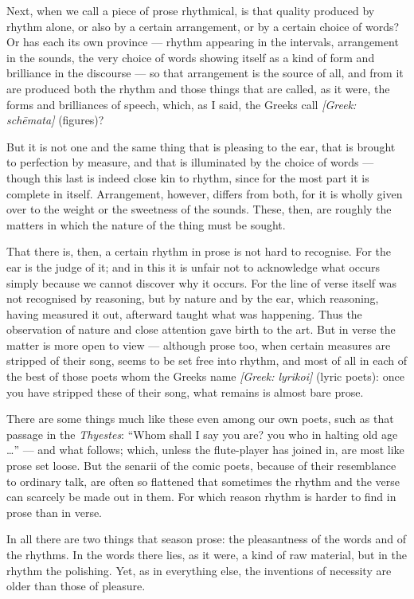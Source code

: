  Next, when we call a piece of prose rhythmical, is that quality produced by rhythm alone, or also by a certain arrangement, or by a certain choice of words? Or has each its own province — rhythm appearing in the intervals, arrangement in the sounds, the very choice of words showing itself as a kind of form and brilliance in the discourse — so that arrangement is the source of all, and from it are produced both the rhythm and those things that are called, as it were, the forms and brilliances of speech, which, as I said, the Greeks call \textit{[Greek: schēmata]} (figures)?

 But it is not one and the same thing that is pleasing to the ear, that is brought to perfection by measure, and that is illuminated by the choice of words — though this last is indeed close kin to rhythm, since for the most part it is complete in itself. Arrangement, however, differs from both, for it is wholly given over to the weight or the sweetness of the sounds. These, then, are roughly the matters in which the nature of the thing must be sought.

 That there is, then, a certain rhythm in prose is not hard to recognise. For the ear is the judge of it; and in this it is unfair not to acknowledge what occurs simply because we cannot discover why it occurs. For the line of verse itself was not recognised by reasoning, but by nature and by the ear, which reasoning, having measured it out, afterward taught what was happening. Thus the observation of nature and close attention gave birth to the art. But in verse the matter is more open to view — although prose too, when certain measures are stripped of their song, seems to be set free into rhythm, and most of all in each of the best of those poets whom the Greeks name \textit{[Greek: lyrikoi]} (lyric poets): once you have stripped these of their song, what remains is almost bare prose.

 There are some things much like these even among our own poets, such as that passage in the \textit{Thyestes}: ``Whom shall I say you are? you who in halting old age \dots'' — and what follows; which, unless the flute-player has joined in, are most like prose set loose. But the senarii of the comic poets, because of their resemblance to ordinary talk, are often so flattened that sometimes the rhythm and the verse can scarcely be made out in them. For which reason rhythm is harder to find in prose than in verse.

 In all there are two things that season prose: the pleasantness of the words and of the rhythms. In the words there lies, as it were, a kind of raw material, but in the rhythm the polishing. Yet, as in everything else, the inventions of necessity are older than those of pleasure.

